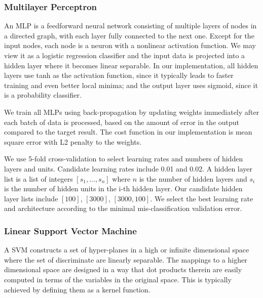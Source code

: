 \documentclass{acm_proc_article-sp}
\begin{document}
\subsubsection{Multilayer Perceptron}
An MLP is a feedforward neural network consisting of multiple layers of nodes in a directed graph, with each layer fully connected to the next one. Except for the input nodes, each node is a neuron with a nonlinear activation function. We may view it as a logistic regression classifier and the input data is projected into a hidden layer where it becomes linear separable. In our implementation, all hidden layers use tanh as the activation function, since it typically leads to faster training and even better local minima; and the output layer uses sigmoid, since it is a probability classifier.

We train all MLPs using back-propagation\cite{rumelhart1986learning} by updating weights immediately after each batch of data is processed, based on the amount of error in the output compared to the target result. The cost function in our implementation is mean square error with L2 penalty to the weights.

We use 5-fold cross-validation to select learning rates and numbers of hidden layers and units. Candidate learning rates include 0.01 and 0.02. A hidden layer list is a list of integers $[s_1,...,s_n]$ where $n$ is the number of hidden layers and $s_i$ is the number of hidden units in the i-th hidden layer. Our candidate hidden layer lists include $[100]$, $[3000]$, $[3000,100]$. We select the best learning rate and architecture according to the minimal mis-classification validation error.

\subsubsection{Linear Support Vector Machine }
A SVM \cite{pineaul13} constructs a set of hyper-planes in a high or infinite dimensional space where the set of discriminate are linearly separable. The mappings to a higher dimensional space are designed in a way that dot products therein are easily computed in terms of the variables in the original space. This is typically achieved by defining them as a kernel function.
\end{document}
